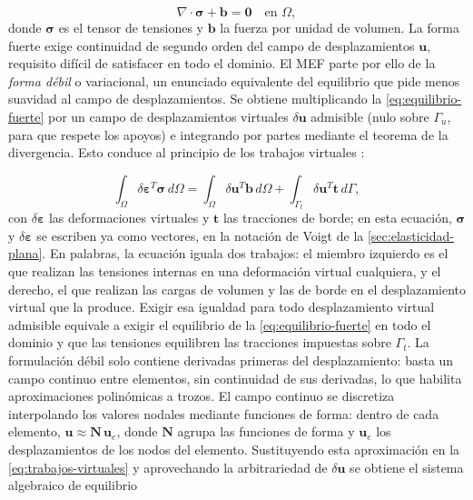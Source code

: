 \begin{equation}
\nabla \cdot \bm{\sigma} + \bm{b} = \bm{0} \quad \text{en } \Omega,
\label{eq:equilibrio-fuerte}
\end{equation}
donde $\bm{\sigma}$ es el tensor de tensiones y $\bm{b}$ la fuerza por unidad de volumen. La forma fuerte exige continuidad de segundo orden del campo de desplazamientos $\bm{u}$, requisito difícil de satisfacer en todo el dominio. El MEF parte por ello de la \emph{forma débil} o variacional, un enunciado equivalente del equilibrio que pide menos suavidad al campo de desplazamientos. Se obtiene multiplicando la \autoref{eq:equilibrio-fuerte} por un campo de desplazamientos virtuales $\delta\bm{u}$ admisible (nulo sobre $\Gamma_u$, para que respete los apoyos) e integrando por partes mediante el teorema de la divergencia. Esto conduce al principio de los trabajos virtuales \autocites[pp.~69-71]{zienkiewicz2013fem}[pp.~77-79]{hughes2000fem}[pp.~612-613]{reddy2006introduction}:

\begin{equation}
\int_\Omega \delta\bm{\varepsilon}^{T} \bm{\sigma} \, d\Omega
= \int_\Omega \delta\bm{u}^{T} \bm{b} \, d\Omega
+ \int_{\Gamma_t} \delta\bm{u}^{T} \bm{t} \, d\Gamma,
\label{eq:trabajos-virtuales}
\end{equation}
con $\delta\bm{\varepsilon}$ las deformaciones virtuales y $\bm{t}$ las tracciones de borde; en esta ecuación, $\bm{\sigma}$ y $\delta\bm{\varepsilon}$ se escriben ya como vectores, en la notación de Voigt de la \autoref{sec:elasticidad-plana}. En palabras, la ecuación iguala dos trabajos: el miembro izquierdo es el que realizan las tensiones internas en una deformación virtual cualquiera, y el derecho, el que realizan las cargas de volumen y las de borde en el desplazamiento virtual que la produce. Exigir esa igualdad para todo desplazamiento virtual admisible equivale a exigir el equilibrio de la \autoref{eq:equilibrio-fuerte} en todo el dominio y que las tensiones equilibren las tracciones impuestas sobre $\Gamma_t$. La formulación débil solo contiene derivadas primeras del desplazamiento: basta un campo continuo entre elementos, sin continuidad de sus derivadas, lo que habilita aproximaciones polinómicas a trozos. El campo continuo se discretiza interpolando los valores nodales mediante funciones de forma: dentro de cada elemento, $\bm{u} \approx \bm{N}\,\bm{u}_e$, donde $\bm{N}$ agrupa las funciones de forma y $\bm{u}_e$ los desplazamientos de los nodos del elemento. Sustituyendo esta aproximación en la \autoref{eq:trabajos-virtuales} y aprovechando la arbitrariedad de $\delta\bm{u}$ se obtiene el sistema algebraico de equilibrio

